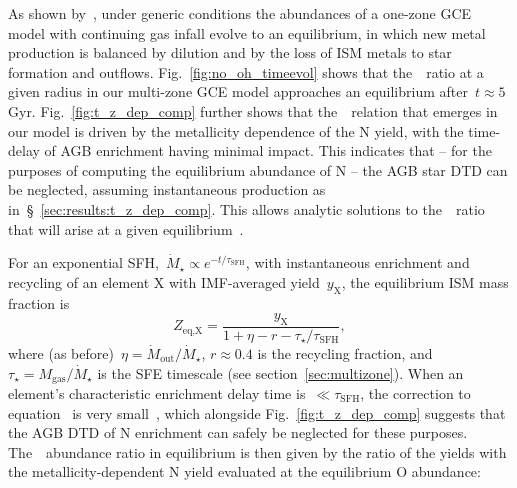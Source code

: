 \documentclass[ms.tex]{subfiles}
\begin{document}
As shown by~\citet{Weinberg2017}, under generic conditions the abundances of a
one-zone GCE model with continuing gas infall evolve to an equilibrium, in
which new metal production is balanced by dilution and by the loss of ISM
metals to star formation and outflows.
Fig.~\ref{fig:no_oh_timeevol} shows that the~\no~ratio at a given radius in our
multi-zone GCE model approaches an equilibrium after~$t \approx 5$ Gyr.
Fig.~\ref{fig:t_z_dep_comp} further shows that the~\ohno~relation that emerges
in our model is driven by the metallicity dependence of the N yield, with the
time-delay of AGB enrichment having minimal impact.
This indicates that -- for the purposes of computing the equilibrium abundance
of N -- the AGB star DTD can be neglected, assuming instantaneous production as
in~\S~\ref{sec:results:t_z_dep_comp}.
This allows analytic solutions to the~\no~ratio that will arise at a
given equilibrium~\oh.
\par
For an exponential SFH,~$\dot{M}_\star \propto e^{-t/\tau_\text{SFH}}$, with
instantaneous enrichment and recycling of an element X with IMF-averaged
yield~$y_\text{X}$, the equilibrium ISM mass fraction is
\begin{equation}
Z_\text{eq,X} = \frac{y_\text{X}}{1 + \eta - r - \tau_\star/\tau_\text{SFH}},
\label{eq:zeq}
\end{equation} 
where (as before)~$\eta = \dot{M}_\text{out} / \dot{M}_\star$, $r \approx 0.4$
is the recycling fraction, and~$\tau_\star = M_\text{gas} / \dot{M}_\star$ is
the SFE timescale (see section~\ref{sec:multizone}).
When an element's characteristic enrichment delay time is~$\ll \tau_\text{SFH}$,
the correction to equation~ is very small~\citep{Weinberg2017},
which alongside Fig.~\ref{fig:t_z_dep_comp} suggests that the AGB DTD of N
enrichment can safely be neglected for these purposes.
The~\no~abundance ratio in equilibrium is then given by the ratio of the yields
with the metallicity-dependent N yield evaluated at the equilibrium O abundance:
\end{document}
